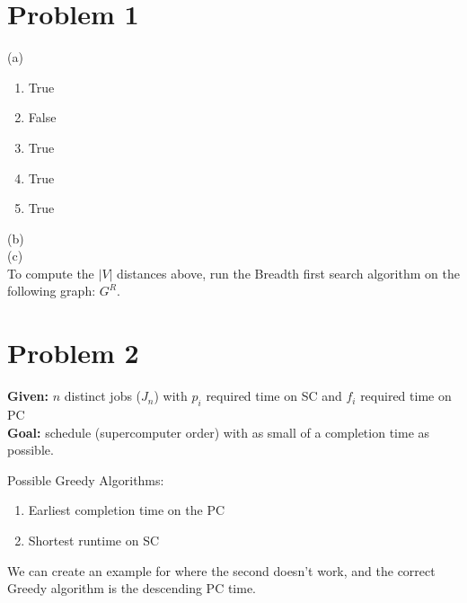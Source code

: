 \documentclass[oneside]{book}
\begin{document}
\section*{Problem 1}
(a)
\begin{enumerate}
    \item True
    \item False
    \item True
    \item True
    \item True
\end{enumerate}
(b)\\
(c)\\
To compute the $|V|$ distances above, run the Breadth first search algorithm on the following graph: $ G^R$.

\pagebreak
\section*{Problem 2}

 {
    \textbf{Given: }$n$ distinct jobs ($J_n$) with $p_i$ required time on SC and $f_i$ required time on PC\\
    \textbf{Goal: }schedule (supercomputer order) with as small of a completion time as possible.
}

Possible Greedy Algorithms:
\begin{enumerate}
    \item Earliest completion time on the PC
    \item Shortest runtime on SC
\end{enumerate}

We can create an example for where the second doesn't work, and the correct Greedy algorithm is the descending PC time.
\end{document}
